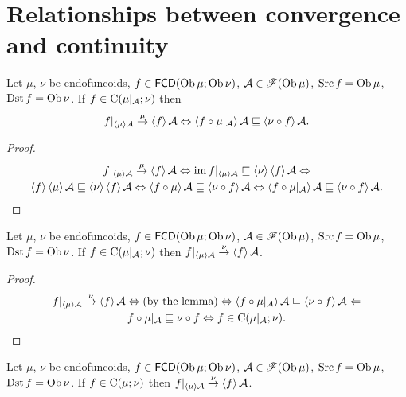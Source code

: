 \section{Relationships between convergence and continuity}
\begin{lem}
Let $\mu$, $\nu$ be endofuncoids, $f\in\mathsf{FCD}(\operatorname{Ob}\mu;\operatorname{Ob}\nu)$,
$\mathcal{A}\in\mathscr{F}(\operatorname{Ob}\mu)$, $\operatorname{Src} f=\operatorname{Ob}\mu$, $\operatorname{Dst} f=\operatorname{Ob}\nu$.
If $f\in\mathrm{C}(\mu|_{\mathcal{A}};\nu)$ then
\[
f|_{\left\langle \mu\right\rangle\mathcal{A}}\overset{\mu}{\rightarrow}\left\langle f\right\rangle\mathcal{A}\Leftrightarrow\left\langle f\circ\mu|_{\mathcal{A}}\right\rangle\mathcal{A}\sqsubseteq\left\langle \nu\circ f\right\rangle\mathcal{A}.
\]
\end{lem}
\begin{proof}
~
\begin{multline*}
f|_{\left\langle \mu\right\rangle\mathcal{A}}\overset{\mu}{\rightarrow}\left\langle f\right\rangle\mathcal{A}\Leftrightarrow\operatorname{im} f|_{\left\langle \mu\right\rangle\mathcal{A}}\sqsubseteq\left\langle \nu\right\rangle\left\langle f\right\rangle\mathcal{A}\Leftrightarrow\\
\left\langle f\right\rangle\left\langle \mu\right\rangle\mathcal{A}\sqsubseteq\left\langle \nu\right\rangle\left\langle f\right\rangle\mathcal{A}\Leftrightarrow\left\langle f\circ\mu\right\rangle\mathcal{A}\sqsubseteq\left\langle \nu\circ f\right\rangle\mathcal{A}\Leftrightarrow\left\langle f\circ\mu|_{\mathcal{A}}\right\rangle\mathcal{A}\sqsubseteq\left\langle \nu\circ f\right\rangle\mathcal{A}.
\end{multline*}
\end{proof}
\begin{thm}
Let $\mu$, $\nu$ be endofuncoids, $f\in\mathsf{FCD}(\operatorname{Ob}\mu;\operatorname{Ob}\nu)$,
$\mathcal{A}\in\mathscr{F}(\operatorname{Ob}\mu)$, $\operatorname{Src} f=\operatorname{Ob}\mu$, $\operatorname{Dst} f=\operatorname{Ob}\nu$.
If $f\in\mathrm{C}(\mu|_{\mathcal{A}};\nu)$ then $f|_{\left\langle \mu\right\rangle\mathcal{A}}\overset{\nu}{\rightarrow}\left\langle f\right\rangle\mathcal{A}$.\end{thm}
\begin{proof}
~
\begin{multline*}
f|_{\left\langle \mu\right\rangle\mathcal{A}}\overset{\nu}{\rightarrow}\left\langle f\right\rangle\mathcal{A}\Leftrightarrow\text{(by the lemma)}\Leftrightarrow\left\langle f\circ\mu|_{\mathcal{A}}\right\rangle\mathcal{A}\sqsubseteq\left\langle \nu\circ f\right\rangle\mathcal{A}\Leftarrow\\
f\circ\mu|_{\mathcal{A}}\sqsubseteq\nu\circ f\Leftrightarrow f\in\mathrm{C}(\mu|_{\mathcal{A}};\nu).
\end{multline*}
\end{proof}
\begin{cor}
Let $\mu$, $\nu$ be endofuncoids, $f\in\mathsf{FCD}(\operatorname{Ob}\mu;\operatorname{Ob}\nu)$,
$\mathcal{A}\in\mathscr{F}(\operatorname{Ob}\mu)$, $\operatorname{Src} f=\operatorname{Ob}\mu$, $\operatorname{Dst} f=\operatorname{Ob}\nu$.
If $f\in\mathrm{C}(\mu;\nu)$ then $f|_{\left\langle \mu\right\rangle\mathcal{A}}\overset{\nu}{\rightarrow}\left\langle f\right\rangle\mathcal{A}$.\end{cor}
